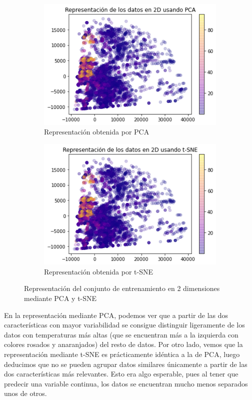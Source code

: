 \documentclass[10pt,a4paper]{article}
\begin{document}
\begin{figure}[h]
	\begin{subfigure}{0.5\textwidth}
		\centering
		\includegraphics[width=\textwidth]{reg_pca}
		\caption{Representación obtenida por PCA}
	\end{subfigure}
	\begin{subfigure}{0.5\textwidth}
		\centering
		\includegraphics[width=\textwidth]{reg_tsne}
		\caption{Representación obtenida por t-SNE}
	\end{subfigure}
	\caption{Representación del conjunto de entrenamiento en 2 dimensiones mediante PCA y t-SNE}
	\label{fig:reg_pca_tsne}
\end{figure}

En la representación mediante PCA, podemos ver que a partir de las dos características con mayor variabilidad se consigue distinguir ligeramente de los datos con temperaturas más altas (que se encuentran más a la izquierda con colores rosados y anaranjados) del resto de datos. Por otro lado, vemos que la representación mediante t-SNE es prácticamente idéntica a la de PCA, luego deducimos que no se pueden agrupar datos similares únicamente a partir de las dos características más relevantes. Esto era algo esperable, pues al tener que predecir una variable continua, los datos se encuentran mucho menos separados unos de otros.
\end{document}
